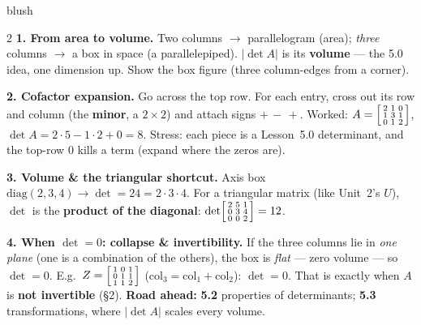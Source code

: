 \documentclass[10pt]{article}
\begin{document}
\begin{skillbox}[Lesson]{blush}
\begin{multicols}{2}
\textbf{1. From area to volume.} Two columns $\to$ parallelogram (area); \emph{three} columns $\to$ a
box in space (a parallelepiped). $|\det A|$ is its \textbf{volume} --- the 5.0 idea, one dimension up.
Show the box figure (three column-edges from a corner).

\textbf{2. Cofactor expansion.} Go across the top row. For each entry, cross out its row and column
(the \textbf{minor}, a $2\times2$) and attach signs $+\,-\,+$. Worked:
$A=\begin{bsmallmatrix} 2 & 1 & 0\\ 1 & 3 & 1\\ 0 & 1 & 2 \end{bsmallmatrix}$,
$\det A=2\!\cdot\!5-1\!\cdot\!2+0=8$. Stress: each piece is a Lesson~5.0 determinant, and the top-row
$0$ kills a term (expand where the zeros are).

\columnbreak

\textbf{3. Volume \& the triangular shortcut.} Axis box
$\mathrm{diag}(2,3,4)\to\det=24=2\!\cdot\!3\!\cdot\!4$. For a triangular matrix (like Unit~2's $U$),
$\det$ is the \textbf{product of the diagonal}: $\det\begin{bsmallmatrix} 2&5&1\\0&3&4\\0&0&2 \end{bsmallmatrix}=12$.

\textbf{4. When $\det=0$: collapse \& invertibility.} If the three columns lie in \emph{one plane}
(one is a combination of the others), the box is \emph{flat} --- zero volume --- so $\det=0$. E.g.\
$Z=\begin{bsmallmatrix} 1&0&1\\0&1&1\\1&1&2 \end{bsmallmatrix}$ (col$_3=$col$_1+$col$_2$): $\det=0$.
That is exactly when $A$ is \textbf{not invertible} (§2). \textbf{Road ahead:} \textbf{5.2} properties
of determinants; \textbf{5.3} transformations, where $|\det A|$ scales every volume.
\end{multicols}
\end{skillbox}
\end{document}
